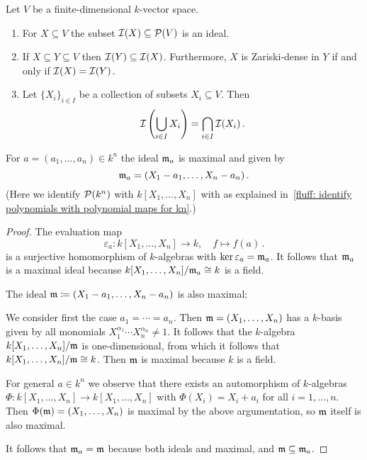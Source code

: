 \begin{lemma}
  Let $V$ be a finite-dimensional $k$-vector space.
  \begin{enumerate}
    \item
      For $X \subseteq V$ the subset $\mathcal{I}(X) \subseteq \mathcal{P}(V)$ is an ideal.
    \item
      If $X \subseteq Y \subseteq V$ then $\mathcal{I}(Y) \subseteq \mathcal{I}(X)$.
      Furthermore, $X$ is Zariski-dense in $Y$ if and only if $\mathcal{I}(X) = \mathcal{I}(Y)$.
    \item
      Let $\{X_i\}_{i \in I}$ be a collection of subsets $X_i \subseteq V$. Then
      \[
          \mathcal{I}\left( \bigcup_{i \in I} X_i \right)
        = \bigcap_{i \in I} \mathcal{I}(X_i) \,.
      \]
  \end{enumerate}
\end{lemma}


\begin{lemma}
  For $a = (a_1, \dotsc, a_n) \in k^n$ the ideal $\mathfrak{m}_a$ is maximal and given by
  \[
    \mathfrak{m}_a = (X_1 - a_1, \dotsc, X_n - a_n) \,.
  \]
  (Here we identify $\mathcal{P}(k^n)$ with $k[X_1, \dotsc, X_n]$ with  as explained in~\ref{fluff: identify polynomials with polynomial maps for kn}.)
\end{lemma}


\begin{proof}
  The evaluation map
  \[
            \varepsilon_a
    \colon  k[X_1, \dotsc, X_n]
    \to     k,
    \quad   f
    \mapsto f(a) \,.
  \]
  is a surjective homomorphism of $k$-algebras with $\ker \varepsilon_a = \mathfrak{m}_a$.
  It follows that $\mathfrak{m}_a$ is a maximal ideal because $k[X_1, \dotsc, X_n]/\mathfrak{m}_a \cong k$ is a field.
  
  The ideal $\mathfrak{m} \coloneqq (X_1 - a_1, \dotsc, X_n - a_n)$ is also maximal:
  
  We consider first the case $a_1 = \dotsb = a_n$.
  Then $\mathfrak{m} = (X_1, \dotsc, X_n)$ has a $k$-basis given by all monomials $X_1^{\alpha_1} \dotsm X_n^{\alpha_n} \neq 1$.
  It follows that the $k$-algebra $k[X_1, \dotsc, X_n]/\mathfrak{m}$ is one-dimensional, from which it follows that $k[X_1, \dotsc, X_n]/\mathfrak{m} \cong k$.
  Then $\mathfrak{m}$ is maximal because $k$ is a field.
  
  For general $a \in k^n$ we observe that there exists an automorphism of $k$-algebras $\Phi \colon k[X_1, \dotsc, X_n] \to k[X_1, \dotsc, X_n]$ with $\Phi(X_i) =  X_i + a_i$ for all $i = 1, \dotsc, n$.
  Then $\Phi(\mathfrak{m}) = (X_1, \dotsc, X_n)$ is maximal by the above argumentation, so $\mathfrak{m}$ itself is also maximal.
  
  It follows that $\mathfrak{m}_a = \mathfrak{m}$ because both ideals and maximal, and $\mathfrak{m} \subseteq \mathfrak{m}_a$.
\end{proof}


